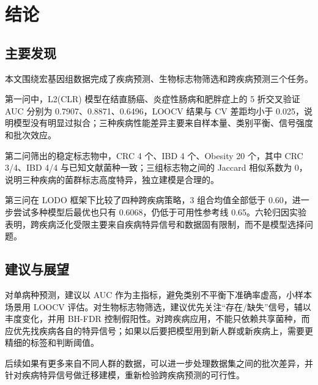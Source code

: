 \section{结论}
\label{sec:conclusion}

\subsection{主要发现}

本文围绕宏基因组数据完成了疾病预测、生物标志物筛选和跨疾病预测三个任务。

第一问中，L2(CLR) 模型在结直肠癌、炎症性肠病和肥胖症上的 5 折交叉验证 AUC 分别为 0.7907、0.8871、0.6496，LOOCV 结果与 CV 差距均小于 0.025，说明模型没有明显过拟合；三种疾病性能差异主要来自样本量、类别平衡、信号强度和批次效应。

第二问筛出的稳定标志物中，CRC 4 个、IBD 4 个、Obesity 20 个，其中 CRC 3/4、IBD 4/4 与已知文献菌种一致；三组标志物之间的 Jaccard 相似系数为 0，说明三种疾病的菌群标志高度特异，独立建模是合理的。

第三问在 LODO 框架下比较了四种跨疾病策略，3 组合均值全部低于 0.60，进一步尝试多种模型后最优也只有 0.6068，仍低于可用性参考线 0.65。六轮归因实验表明，跨疾病泛化受限主要来自疾病特异信号和数据固有限制，而不是模型选择问题。

\subsection{建议与展望}

对单病种预测，建议以 AUC 作为主指标，避免类别不平衡下准确率虚高，小样本场景用 LOOCV 评估。对生物标志物筛选，建议优先关注“存在/缺失”信号，辅以丰度变化，并用 BH-FDR 控制假阳性。对跨疾病应用，不能只依赖共享菌种，而应优先找疾病各自的特异信号；如果以后要把模型用到新人群或新疾病上，需要更精细的标签和判断阈值。

后续如果有更多来自不同人群的数据，可以进一步处理数据集之间的批次差异，并针对疾病特异信号做迁移建模，重新检验跨疾病预测的可行性。
